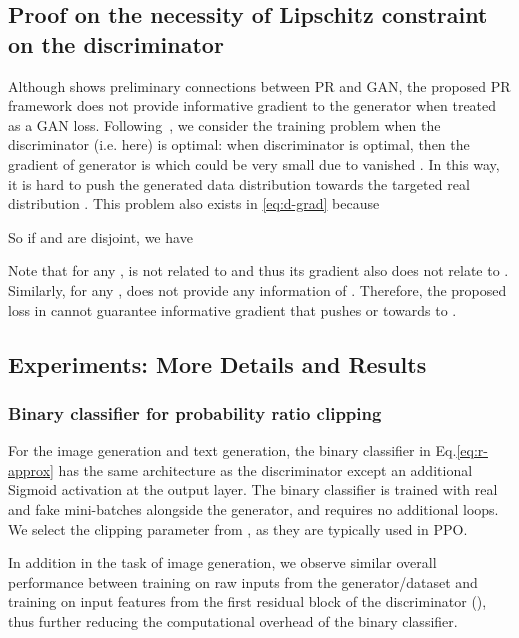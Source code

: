 \documentclass{article}
\newcommand{\0}{\bm{0}}
\begin{document}
\subsection{Proof on the necessity of Lipschitz constraint on the discriminator} \label{pf_issue}
Although \cite{hu2018deep} shows preliminary connections between PR and GAN, the proposed PR framework does not provide informative gradient to the generator when treated as a GAN loss. 
Following~\cite{zhou2018understanding}, we consider the training problem when the discriminator (i.e.  here) is optimal: when discriminator  is optimal, then the gradient of generator  is  which could be very small due to vanished . In this way, it is hard to push the generated data distribution  towards the targeted real distribution . This problem also exists in \eqref{eq:d-grad} because

So if  and  are disjoint, we have

Note that for any ,  is not related to  and thus its gradient  also does not relate to . Similarly, for any ,  does not provide any information of  . Therefore, the proposed loss in \cite{hu2018deep} cannot guarantee informative gradient \cite{zhou2018understanding} that pushes  or  towards to . 

\subsection{Experiments: More Details and Results}

\subsubsection{Binary classifier for probability ratio clipping}
For the image generation and text generation, the binary classifier  in Eq.\eqref{eq:r-approx} has the same architecture as the discriminator except an additional Sigmoid activation at the output layer. The binary classifier is trained with real and fake mini-batches alongside the generator, and requires no additional loops. We select the clipping parameter  from , as they are typically used in PPO.

In addition in the task of image generation, we observe similar overall performance between training on raw inputs from the generator/dataset and training on input features from the first residual block of the discriminator (), thus further reducing the computational overhead of the binary classifier.
\end{document}
